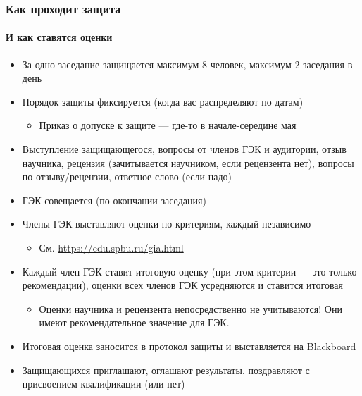 \documentclass[xetex,mathserif,serif]{beamer}
\begin{document}
    \begin{frame}
        \frametitle{Как проходит защита}
        \framesubtitle{И как ставятся оценки}
        \begin{footnotesize}
            \begin{itemize}
                \item За одно заседание защищается максимум 8 человек, максимум 2 заседания в день
                \item Порядок защиты фиксируется (когда вас распределяют по датам)
                \begin{itemize}
                    \item \footnotesize{Приказ о допуске к защите --- где-то в начале-середине мая}
                \end{itemize}
                \item Выступление защищающегося, вопросы от членов ГЭК и аудитории, отзыв научника, рецензия (зачитывается научником, если рецензента нет), вопросы по отзыву/рецензии, ответное слово (если надо)
                \item ГЭК совещается (по окончании заседания)
                \item Члены ГЭК выставляют оценки по критериям, каждый независимо
                \begin{itemize}
                    \item \footnotesize{См. \url{https://edu.spbu.ru/gia.html}}
                \end{itemize}
                \item Каждый член ГЭК ставит итоговую оценку (при этом критерии --- это только рекомендации), оценки всех членов ГЭК усредняются и ставится итоговая
                \begin{itemize}
                    \item \footnotesize{Оценки научника и рецензента непосредственно не учитываются! Они имеют рекомендательное значение для ГЭК.}
                \end{itemize}
                \item Итоговая оценка заносится в протокол защиты и выставляется на Blackboard
                \item Защищающихся приглашают, оглашают результаты, поздравляют с присвоением квалификации (или нет)
            \end{itemize}
        \end{footnotesize}
    \end{frame}
\end{document}
